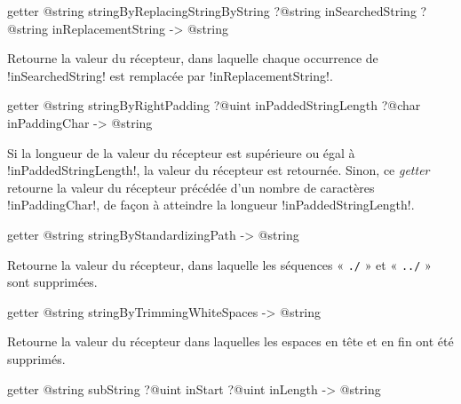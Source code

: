 \begin{galgasbox}
getter @string stringByReplacingStringByString
     ?@string inSearchedString
     ?@string inReplacementString  -> @string
\end{galgasbox}

Retourne la valeur du récepteur, dans laquelle chaque occurrence de \ggs!inSearchedString! est remplacée par \ggs!inReplacementString!.








\begin{galgasbox}
getter @string stringByRightPadding
   ?@uint inPaddedStringLength
   ?@char inPaddingChar -> @string
\end{galgasbox}

Si la longueur de la valeur du récepteur est supérieure ou égal à \ggs!inPaddedStringLength!, la valeur du récepteur est retournée. Sinon, ce \emph{getter} retourne la valeur du récepteur précédée d'un nombre de caractères \ggs!inPaddingChar!, de façon à atteindre la longueur \ggs!inPaddedStringLength!.





\begin{galgasbox}
getter @string stringByStandardizingPath -> @string
\end{galgasbox}

Retourne la valeur du récepteur, dans laquelle les séquences « \texttt{./} » et « \texttt{../} » sont supprimées.








\begin{galgasbox}
getter @string stringByTrimmingWhiteSpaces -> @string
\end{galgasbox}

Retourne la valeur du récepteur dans laquelles les espaces en tête et en fin ont été supprimés.





\begin{galgasbox}
getter @string subString ?@uint inStart ?@uint inLength -> @string
\end{galgasbox}

